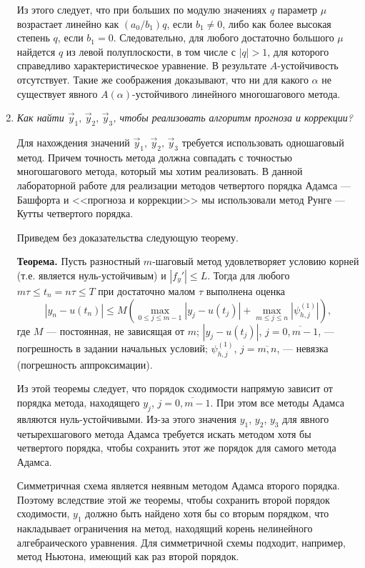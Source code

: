 \documentclass[12pt, a4paper]{article}
\begin{document}
\begin{enumerate}
		Из этого следует, что при больших по модулю значениях $q$ параметр $\mu$ возрастает линейно как $(a_0/b_1)q$, если $b_1 \neq 0$, либо как более высокая степень $q$, если $b_1 = 0$. Следовательно, для любого достаточно большого $\mu$ найдется $q$ из левой полуплоскости, в том числе с $|q| > 1$, для которого справедливо характеристическое уравнение. В результате $A$-устойчивость отсутствует. Такие же соображения доказывают, что ни для какого $\alpha$ не существует явного $A(\alpha)$-устойчивого линейного многошагового метода.
		
		\item \textit{Как найти $\vec y_1,\,\vec y_2,\,\vec y_3$, чтобы реализовать алгоритм прогноза и коррекции?}
		\smallskip
		
		Для нахождения значений $\vec y_1,\,\vec y_2,\,\vec y_3$ требуется использовать одношаговый метод. Причем точность метода должна совпадать с точностью многошагового метода, который мы хотим реализовать. В данной лабораторной работе для реализации методов четвертого порядка Адамса --- Башфорта и <<прогноза и коррекции>> мы использовали метод Рунге --- Кутты четвертого порядка.
		
		
		Приведем без доказательства следующую теорему.
		
		\textbf{Теорема.} Пусть разностный $m$-шаговый метод удовлетворяет условию корней (т.е. является нуль-устойчивым) и $|f_y'| \le L$. Тогда для любого $m\tau \le t_n = n\tau \le T$ при достаточно малом $\tau$ выполнена оценка
		\[
		|y_n - u(t_n)| \le M \left(\max_{0\le j \le m-1} |y_j - u(t_j)| + \max_{m \le j \le n} \left|\psi_{h,j}^{(1)}\right|\right),
		\]
		где $M$ --- постоянная, не зависящая от $m$; $|y_j - u(t_j)|$, $j = \overline{0, m-1}$, --- погрешность в задании начальных условий; $\psi_{h,j}^{(1)}$, $j = \overline{m, n}$, --- невязка (погрешность аппроксимации).
		
		Из этой теоремы следует, что порядок сходимости напрямую зависит от порядка метода, находящего $y_j$, $j = \overline{0, m-1}$. При этом все методы Адамса являются нуль-устойчивыми. Из-за этого значения $y_1$, $y_2$, $y_3$ для явного четырехшагового метода Адамса требуется искать методом хотя бы четвертого порядка, чтобы сохранить этот же порядок для самого метода Адамса.
		
		Симметричная схема является неявным методом Адамса второго порядка. Поэтому вследствие этой же теоремы, чтобы сохранить второй порядок сходимости, $y_1$ должно быть найдено хотя бы со вторым порядком, что накладывает ограничения на метод, находящий корень нелинейного алгебраического уравнения. Для симметричной схемы подходит, например, метод Ньютона, имеющий как раз второй порядок.
		

\end{enumerate}
\end{document}
